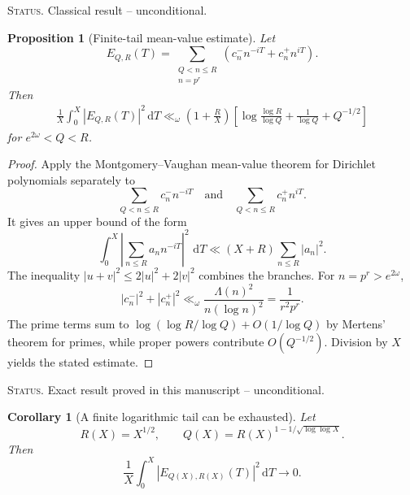\documentclass[11pt]{amsart}
\numberwithin{equation}{section}
\theoremstyle{plain}
\newtheorem{proposition}[theorem]{Proposition}
\newtheorem{corollary}[theorem]{Corollary}
\theoremstyle{definition}
\theoremstyle{remark}
\newcommand{\1}{\mathbf{1}}
\newcommand{\dd}{\,\mathrm{d}}
\newcommand{\statusnote}[1]{%
  \par\smallskip\noindent
  \begingroup\footnotesize\textsc{Status.} #1\endgroup
  \par\smallskip}
\begin{document}
\statusnote{Classical result -- unconditional.}
\begin{proposition}[Finite-tail mean-value estimate]
\label{prop:finite_tail_mean_value}
Let
\begin{equation}
E_{Q,R}(T)
=
\sum_{\substack{Q<n\leq R\\n=p^r}}
\left(c_n^-n^{-iT}+c_n^+n^{iT}\right).
\label{eq:finite_tail_ER}
\end{equation}
Then
\begin{align}
\frac1X\int_0^X|E_{Q,R}(T)|^2\dd T
\ll_\omega
\left(1+\frac RX\right)
\left[
\log\frac{\log R}{\log Q}
+
\frac1{\log Q}
+
Q^{-1/2}
\right]
\label{eq:finite_tail_mean_value}
\end{align}
for $e^{2\omega}<Q<R$.
\end{proposition}

\begin{proof}
Apply the Montgomery--Vaughan mean-value theorem for Dirichlet polynomials
\cite[Chapter~7]{MontgomeryVaughan2007} separately to
\begin{equation}
\sum_{Q<n\leq R}c_n^-n^{-iT}
\quad\text{and}\quad
\sum_{Q<n\leq R}c_n^+n^{iT}.
\label{eq:MV_two_polynomials}
\end{equation}
It gives an upper bound of the form
\begin{equation}
\int_0^X\left|\sum_{n\leq R}a_nn^{-iT}\right|^2\,\dd T
\ll
(X+R)\sum_{n\leq R}|a_n|^2.
\label{eq:MV_mean_value_used}
\end{equation}
The inequality \(|u+v|^2\leq2|u|^2+2|v|^2\) combines the branches.  For
\(n=p^r>e^{2\omega}\),
\begin{equation}
|c_n^-|^2+|c_n^+|^2
\ll_\omega
\frac{\Lambda(n)^2}{n(\log n)^2}
=
\frac1{r^2p^r}.
\label{eq:finite_tail_coeff_square}
\end{equation}
The prime terms sum to
\(\log(\log R/\log Q)+O(1/\log Q)\) by Mertens' theorem for primes, while
proper powers contribute \(O(Q^{-1/2})\).  Division by \(X\) yields the
stated estimate.
\end{proof}

\statusnote{Exact result proved in this manuscript -- unconditional.}
\begin{corollary}[A finite logarithmic tail can be exhausted]
\label{cor:finite_log_tail_exhaustion}
Let
\begin{equation}
R(X)=X^{1/2},
\qquad
Q(X)=R(X)^{1-1/\sqrt{\log\log X}}.
\label{eq:finite_tail_choice}
\end{equation}
Then
\begin{equation}
\frac1X\int_0^X|E_{Q(X),R(X)}(T)|^2\dd T
\longrightarrow0.
\label{eq:finite_tail_exhaustion}
\end{equation}
\end{corollary}
\end{document}
